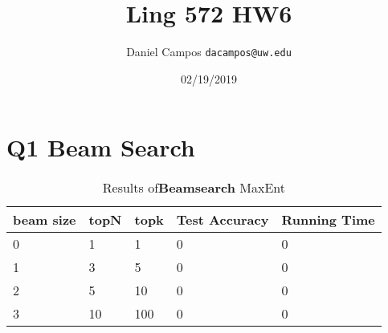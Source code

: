 \documentclass[11pt]{article}
\begin{document}
\title{Ling 572 HW6}
\author{Daniel Campos  \tt {dacampos@uw.edu}}
\date{02/19/2019}
\maketitle 
\section{ Q1 Beam Search}
\begin{table}[h]
\centering
\caption{Results of{\bf Beamsearch} MaxEnt}
\label{table1}
\begin{tabular}{|l|l|l|l|l|} \hline
beam size & topN & topk & Test Accuracy & Running Time \\ \hline
0 & 1 & 1 & 0 & 0 \\ \hline
1 & 3 & 5 & 0 & 0 \\ \hline
2 & 5 & 10 & 0 & 0 \\ \hline
3 & 10 & 100 & 0 & 0 \\ \hline
\end{tabular}
\end{table}
\end{document}
